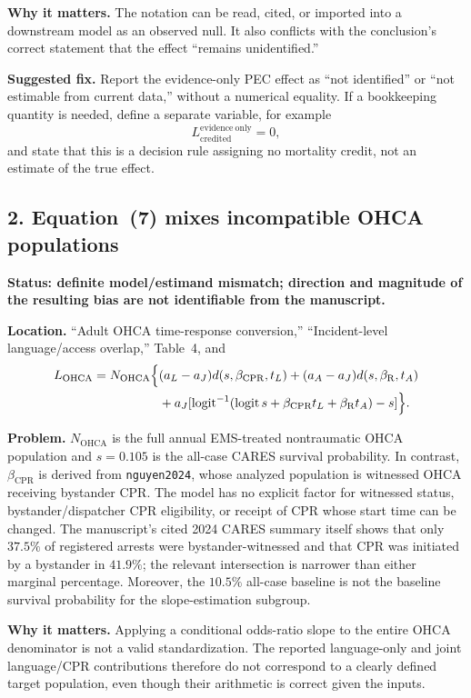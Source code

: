\documentclass[11pt]{article}
\begin{document}
\textbf{Why it matters.} The notation can be read, cited, or imported into a
downstream model as an observed null.  It also conflicts with the conclusion's
correct statement that the effect ``remains unidentified.''

\textbf{Suggested fix.} Report the evidence-only PEC effect as ``not identified''
or ``not estimable from current data,'' without a numerical equality.  If a
bookkeeping quantity is needed, define a separate variable, for example
\[
L_{\mathrm{credited}}^{\mathrm{evidence\ only}}=0,
\]
and state that this is a decision rule assigning no mortality credit, not an
estimate of the true effect.

\subsection*{2. Equation~\textup{(7)} mixes incompatible OHCA populations}

\textbf{Status: definite model/estimand mismatch; direction and magnitude of
the resulting bias are not identifiable from the manuscript.}

\textbf{Location.} ``Adult OHCA time-response conversion,''
``Incident-level language/access overlap,'' Table~4, and
\begin{align*}
L_{\mathrm{OHCA}}=N_{\mathrm{OHCA}}\Bigl\{&(a_L-a_J)
d(s,\beta_{\mathrm{CPR}},t_L)+(a_A-a_J)d(s,\beta_{\mathrm R},t_A)\\
&+a_J[\operatorname{logit}^{-1}(\operatorname{logit}s
+\beta_{\mathrm{CPR}}t_L+\beta_{\mathrm R}t_A)-s]\Bigr\}.
\end{align*}

\textbf{Problem.} $N_{\mathrm{OHCA}}$ is the full annual EMS-treated
nontraumatic OHCA population and $s=0.105$ is the all-case CARES survival
probability.  In contrast, $\beta_{\mathrm{CPR}}$ is derived from
\texttt{nguyen2024}, whose analyzed population is witnessed OHCA receiving
bystander CPR.  The model has no explicit factor for witnessed status,
bystander/dispatcher CPR eligibility, or receipt of CPR whose start time can be
changed.  The manuscript's cited 2024 CARES summary itself shows that only
$37.5\%$ of registered arrests were bystander-witnessed and that CPR was
initiated by a bystander in $41.9\%$; the relevant intersection is narrower
than either marginal percentage.  Moreover, the $10.5\%$ all-case baseline is
not the baseline survival probability for the slope-estimation subgroup.

\textbf{Why it matters.} Applying a conditional odds-ratio slope to the entire
OHCA denominator is not a valid standardization.  The reported language-only
and joint language/CPR contributions therefore do not correspond to a clearly
defined target population, even though their arithmetic is correct given the
inputs.
\end{document}
